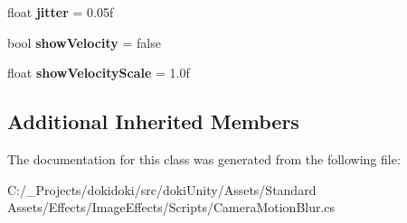 \begin{DoxyCompactItemize}
\item 
float {\bfseries jitter} = 0.\+05f\hypertarget{class_unity_standard_assets_1_1_image_effects_1_1_camera_motion_blur_a05ab2d0c4ecd827f05a6fccb9dc572bb}{}\label{class_unity_standard_assets_1_1_image_effects_1_1_camera_motion_blur_a05ab2d0c4ecd827f05a6fccb9dc572bb}

\item 
bool {\bfseries show\+Velocity} = false\hypertarget{class_unity_standard_assets_1_1_image_effects_1_1_camera_motion_blur_a3d537fe58f5088b59edbeafae8b7ec32}{}\label{class_unity_standard_assets_1_1_image_effects_1_1_camera_motion_blur_a3d537fe58f5088b59edbeafae8b7ec32}

\item 
float {\bfseries show\+Velocity\+Scale} = 1.\+0f\hypertarget{class_unity_standard_assets_1_1_image_effects_1_1_camera_motion_blur_a2c3ab3b871c9f4cd8ed9206dcdd56b86}{}\label{class_unity_standard_assets_1_1_image_effects_1_1_camera_motion_blur_a2c3ab3b871c9f4cd8ed9206dcdd56b86}

\end{DoxyCompactItemize}
\subsection*{Additional Inherited Members}


The documentation for this class was generated from the following file\+:\begin{DoxyCompactItemize}
\item 
C\+:/\+\_\+\+Projects/dokidoki/src/doki\+Unity/\+Assets/\+Standard Assets/\+Effects/\+Image\+Effects/\+Scripts/Camera\+Motion\+Blur.\+cs\end{DoxyCompactItemize}
